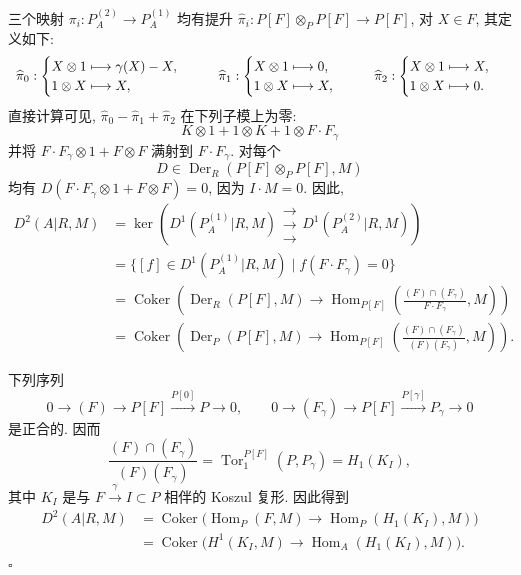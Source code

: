 三个映射 $\pi_i:P_A^{(2)}\longrightarrow P_A^{(1)}$ 均有提升
$\widehat\pi_i:P[F]\otimes_PP[F]\longrightarrow P[F]$, 对 $X\in F$, 其定义如下:
\[
\begin{array}{c@{\qquad}c@{\qquad}c}
\widehat\pi_0:
\begin{cases}
 X\otimes1\longmapsto\gamma(X)-X,\\
 1\otimes X\longmapsto X,
\end{cases}
&
\widehat\pi_1:
\begin{cases}
 X\otimes1\longmapsto0,\\
 1\otimes X\longmapsto X,
\end{cases}
&
\widehat\pi_2:
\begin{cases}
 X\otimes1\longmapsto X,\\
 1\otimes X\longmapsto0.
\end{cases}
\end{array}
\]
直接计算可见, $\widehat\pi_0-\widehat\pi_1+\widehat\pi_2$ 在下列子模上为零:
\[
 K\otimes1+1\otimes K+1\otimes F\cdot F_\gamma
\]
并将 $F\cdot F_\gamma\otimes1+F\otimes F$ 满射到 $F\cdot F_\gamma$. 对每个
\[
 D\in\operatorname{Der}_R(P[F]\otimes_PP[F],M)
\]
均有 $D(F\cdot F_\gamma\otimes1+F\otimes F)=0$, 因为 $I\cdot M=0$. 因此,
\begin{align*}
D^2(A|R,M)
 &=\ker\left(
   D^1(P_A^{(1)}|R,M)
   \mathrel{\substack{\longrightarrow\\[-.6ex]\longrightarrow\\[-.6ex]\longrightarrow}}
   D^1(P_A^{(2)}|R,M)\right)\\
 &=\{[f]\in D^1(P_A^{(1)}|R,M)
       \mid f(F\cdot F_\gamma)=0\}\\
 &=\operatorname{Coker}\left(
   \operatorname{Der}_R(P[F],M)\longrightarrow
   \operatorname{Hom}_{P[F]}
   \left(\frac{(F)\cap(F_\gamma)}{F\cdot F_\gamma},M\right)
   \right)\\
 &=\operatorname{Coker}\left(
   \operatorname{Der}_P(P[F],M)\longrightarrow
   \operatorname{Hom}_{P[F]}
   \left(\frac{(F)\cap(F_\gamma)}{(F)(F_\gamma)},M\right)
   \right).
\end{align*}

下列序列
\[
 0\longrightarrow(F)\longrightarrow P[F]
 \xrightarrow{P[0]}P\longrightarrow0,
 \qquad
 0\longrightarrow(F_\gamma)\longrightarrow P[F]
 \xrightarrow{P[\gamma]}P_\gamma\longrightarrow0
\]
是正合的. 因而
\[
 \frac{(F)\cap(F_\gamma)}{(F)(F_\gamma)}
 =\operatorname{Tor}_1^{P[F]}(P,P_\gamma)
 =H_1(K_I),
\]
其中 $K_I$ 是与 $F\xrightarrow{\gamma}I\subset P$ 相伴的 Koszul 复形. 因此得到
\begin{align*}
D^2(A|R,M)
 &=\operatorname{Coker}\bigl(
   \operatorname{Hom}_P(F,M)\longrightarrow
   \operatorname{Hom}_P(H_1(K_I),M)\bigr)\\
 &=\operatorname{Coker}\bigl(
   H^1(K_I,M)\longrightarrow
   \operatorname{Hom}_A(H_1(K_I),M)\bigr).
\end{align*}
\hfill$\square$

